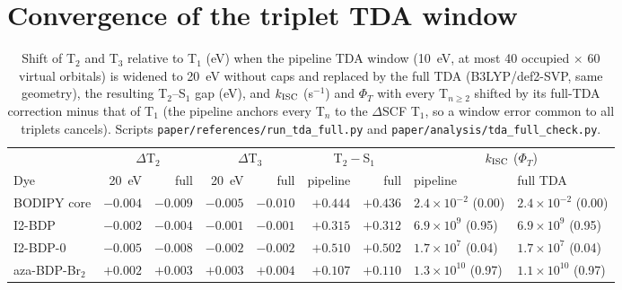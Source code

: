 \section{Convergence of the triplet TDA window}
\begin{table}
  \caption{Shift of T$_2$ and T$_3$ relative to T$_1$ (eV) when the pipeline TDA window (10~eV, at most 40 occupied $\times$ 60
  virtual orbitals) is widened to 20~eV without caps and replaced by the full TDA (B3LYP/def2-SVP, same geometry),
  the resulting T$_2$--S$_1$ gap (eV), and $k_\mathrm{ISC}$ (s$^{-1}$) and $\Phi_T$ with every T$_{n\ge2}$ shifted by its
  full-TDA correction minus that of T$_1$ (the pipeline anchors every T$_n$ to the $\Delta$SCF T$_1$, so a
  window error common to all triplets cancels). Scripts \texttt{paper/references/run\_tda\_full.py} and \texttt{paper/analysis/tda\_full\_check.py}.}
  \label{tab:tdafull}
  \footnotesize\setlength{\tabcolsep}{3pt}
  \begin{tabular}{lrrrrrrll}
    \toprule
    & \multicolumn{2}{c}{$\Delta$T$_2$} & \multicolumn{2}{c}{$\Delta$T$_3$} & \multicolumn{2}{c}{T$_2-$S$_1$} & \multicolumn{2}{c}{$k_\mathrm{ISC}$ ($\Phi_T$)} \\
    Dye & 20~eV & full & 20~eV & full & pipeline & full & pipeline & full TDA \\
    \midrule
    BODIPY core & $-0.004$ & $-0.009$ & $-0.005$ & $-0.010$ & $+0.444$ & $+0.436$ & $2.4\times10^{-2}$ (0.00) & $2.4\times10^{-2}$ (0.00) \\
    I2-BDP & $-0.002$ & $-0.004$ & $-0.001$ & $-0.001$ & $+0.315$ & $+0.312$ & $6.9\times10^{9}$ (0.95) & $6.9\times10^{9}$ (0.95) \\
    I2-BDP-0 & $-0.005$ & $-0.008$ & $-0.002$ & $-0.002$ & $+0.510$ & $+0.502$ & $1.7\times10^{7}$ (0.04) & $1.7\times10^{7}$ (0.04) \\
    aza-BDP-Br$_2$ & $+0.002$ & $+0.003$ & $+0.003$ & $+0.004$ & $+0.107$ & $+0.110$ & $1.3\times10^{10}$ (0.97) & $1.1\times10^{10}$ (0.97) \\
    \bottomrule
  \end{tabular}
\end{table}


